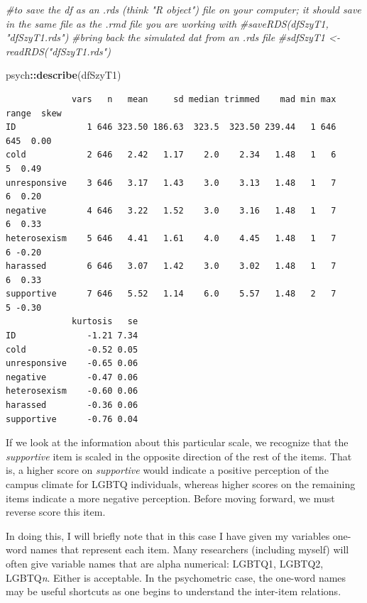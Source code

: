 \documentclass[
  english,
]{book}
\newenvironment{Shaded}{\begin{snugshade}}{\end{snugshade}}
\newcommand{\CommentTok}[1]{\textcolor[rgb]{0.56,0.35,0.01}{\textit{#1}}}
\newcommand{\KeywordTok}[1]{\textcolor[rgb]{0.13,0.29,0.53}{\textbf{#1}}}
\newcommand{\NormalTok}[1]{#1}
\newcommand{\OperatorTok}[1]{\textcolor[rgb]{0.81,0.36,0.00}{\textbf{#1}}}
\begin{document}
\begin{Shaded}
\begin{Highlighting}[]
\CommentTok{#to save the df as an .rds (think "R object") file on your computer; it should save in the same file as the .rmd file you are working with}
\CommentTok{#saveRDS(dfSzyT1, "dfSzyT1.rds")}
\CommentTok{#bring back the simulated dat from an .rds file}
\CommentTok{#sdfSzyT1 <- readRDS("dfSzyT1.rds")}
\end{Highlighting}
\end{Shaded}

\begin{Shaded}
\begin{Highlighting}[]
\NormalTok{psych}\OperatorTok{::}\KeywordTok{describe}\NormalTok{(dfSzyT1)}
\end{Highlighting}
\end{Shaded}

\begin{verbatim}
             vars   n   mean     sd median trimmed    mad min max range  skew
ID              1 646 323.50 186.63  323.5  323.50 239.44   1 646   645  0.00
cold            2 646   2.42   1.17    2.0    2.34   1.48   1   6     5  0.49
unresponsive    3 646   3.17   1.43    3.0    3.13   1.48   1   7     6  0.20
negative        4 646   3.22   1.52    3.0    3.16   1.48   1   7     6  0.33
heterosexism    5 646   4.41   1.61    4.0    4.45   1.48   1   7     6 -0.20
harassed        6 646   3.07   1.42    3.0    3.02   1.48   1   7     6  0.33
supportive      7 646   5.52   1.14    6.0    5.57   1.48   2   7     5 -0.30
             kurtosis   se
ID              -1.21 7.34
cold            -0.52 0.05
unresponsive    -0.65 0.06
negative        -0.47 0.06
heterosexism    -0.60 0.06
harassed        -0.36 0.06
supportive      -0.76 0.04
\end{verbatim}

If we look at the information about this particular scale, we recognize that the \emph{supportive} item is scaled in the opposite direction of the rest of the items. That is, a higher score on \emph{supportive} would indicate a positive perception of the campus climate for LGBTQ individuals, whereas higher scores on the remaining items indicate a more negative perception. Before moving forward, we must reverse score this item.

In doing this, I will briefly note that in this case I have given my variables one-word names that represent each item. Many researchers (including myself) will often give variable names that are alpha numerical: LGBTQ1, LGBTQ2, LGBTQ\emph{n}. Either is acceptable. In the psychometric case, the one-word names may be useful shortcuts as one begins to understand the inter-item relations.
\end{document}
